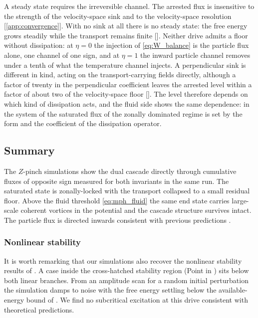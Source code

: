 \documentclass{jpp}
\newcommand{\circled}[1]{\tikz[baseline=(char.base)]{\node[shape=circle,draw,inner sep=1.2pt,line width=0.4pt] (char) {\footnotesize #1};}}
\begin{document}
A steady state requires the irreversible channel. The arrested flux is insensitive to the strength of the velocity-space sink and to the velocity-space resolution [\cref{app:convergence}]. With no sink at all there is no steady state: the free energy grows steadily while the transport remains finite []. Neither drive admits a floor without dissipation: at $\eta = 0$ the injection of \cref{eq:W_balance} is the particle flux alone, one channel of one sign, and at $\eta = 1$ the inward particle channel removes under a tenth of what the temperature channel injects. A perpendicular sink is different in kind, acting on the transport-carrying fields directly, although a factor of twenty in the perpendicular coefficient leaves the arrested level within a factor of about two of the velocity-space floor []. The level therefore depends on which kind of dissipation acts, and the fluid side shows the same dependence: in the system of \citet{ClarkeUnpub} the saturated flux of the zonally dominated regime is set by the form and the coefficient of the dissipation operator.

\subsection{Summary}\label{sec:nl_summary}

The $Z$-pinch simulations show the dual cascade directly through cumulative fluxes of opposite sign measured for both invariants in the same run. The saturated state is zonally-locked with the transport collapsed to a small residual floor. Above the fluid threshold \cref{eq:mph_fluid} the same end state carries large-scale coherent vortices in the potential and the cascade structure survives intact. The particle flux is directed inwards consistent with previous predictions \citep{HelanderConnor2016,MPH2018}.


\subsubsection{Nonlinear stability}
\label{sec:nonlinear_stability}

It is worth remarking that our simulations also recover the nonlinear stability results of \citet{Helander2017}. A case inside the cross-hatched stability region (Point \circled{D} in ) sits below both linear branches. From an amplitude scan for a random initial perturbation the simulation damps to noise with the free energy settling below the available-energy bound of \citet{Helander2017}. We find no subcritical excitation at this drive consistent with theoretical predictions. 
\end{document}
